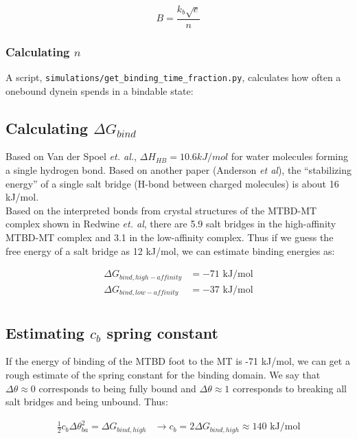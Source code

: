 \documentclass[10pt]{article} %
\begin{document}
\begin{equation*}
  B = \frac{k_{b}\sqrt{e}}{n}
\end{equation*}

\subsubsection{Calculating $n$}
A script, \verb|simulations/get_binding_time_fraction.py|, calculates how often
a onebound dynein spends in a bindable state:



\subsection{Calculating $\Delta G_{bind}$}
Based on Van der Spoel \textit{et. al.}, $\Delta H_{HB} = 10.6kJ/mol$ for water molecules forming a single hydrogen bond. Based on another paper (Anderson \textit{et al}), the
``stabilizing energy'' of a single salt bridge (H-bond between charged molecules) is about 16 kJ/mol.\\

Based on the interpreted bonds from crystal structures of the MTBD-MT complex shown in Redwine \textit{et. al}, there are 5.9 salt bridges in the high-affinity MTBD-MT
complex and 3.1 in the low-affinity complex. Thus if we guess the free energy of a salt bridge as 12 kJ/mol, we can estimate binding energies as:

\begin{align*}
  \Delta G_{bind, high-affinity} &= -71 \mbox{ kJ/mol}\\
  \Delta G_{bind, low-affinity} &= -37 \mbox{ kJ/mol}\\
\end{align*}

\subsection{Estimating $c_b$ spring constant}
If the energy of binding of the MTBD foot to the MT is -71 kJ/mol, we can get a rough estimate of the spring constant for the binding domain. We say that
$\Delta \theta \approx 0$ corresponds to being fully bound and $\Delta \theta \approx 1$ corresponds to breaking all salt bridges and being unbound. Thus:

\begin{align*}
  \frac 12 c_b \Delta \theta_{ba}^2 = \Delta G_{bind, high} &\rightarrow c_b = 2\Delta G_{bind, high} \approx 140 \mbox{ kJ/mol}\\
\end{align*}
\end{document}
